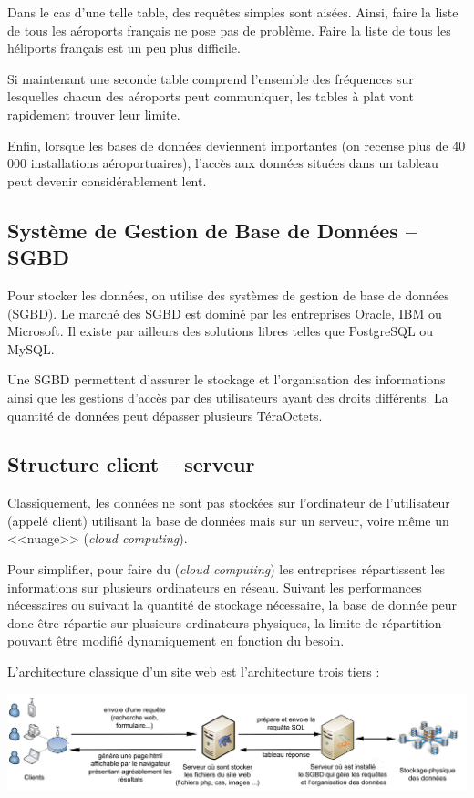 \documentclass[10pt,fleqn]{article} %
\begin{document}
Dans le cas d'une telle table, des requêtes simples sont aisées. Ainsi, faire la liste de tous les aéroports français ne pose pas de problème. Faire la liste de tous les héliports français est un peu plus difficile. 

Si maintenant une seconde table comprend l'ensemble des fréquences sur lesquelles chacun des aéroports peut communiquer, les tables à plat vont rapidement trouver leur limite. 

Enfin, lorsque les bases de données deviennent importantes (on recense plus de 40 000 installations aéroportuaires), l'accès aux données situées dans un tableau peut devenir considérablement lent. 

\subsection{Système de Gestion de Base de Données -- SGBD}
Pour stocker les données, on utilise des systèmes de gestion de base de données (SGBD). Le marché des SGBD est dominé par les entreprises Oracle, IBM ou Microsoft. Il existe par ailleurs des solutions libres telles que PostgreSQL ou MySQL. 

Une SGBD permettent d'assurer le stockage et l'organisation des informations ainsi que les gestions d'accès par des utilisateurs ayant des droits différents. La quantité de données peut dépasser plusieurs TéraOctets.


\subsection{Structure client -- serveur}


Classiquement, les données ne sont pas stockées sur l'ordinateur de l'utilisateur (appelé client) utilisant la base de données mais sur un serveur, voire même un <<nuage>> (\textit{cloud computing}). 

Pour simplifier, pour faire du (\textit{cloud computing}) les entreprises répartissent les informations sur plusieurs ordinateurs en réseau. Suivant les performances nécessaires ou suivant la quantité de stockage nécessaire, la base de donnée peur donc être répartie sur plusieurs ordinateurs physiques, la limite de répartition pouvant être modifié dynamiquement en fonction du besoin. 

L'architecture classique d'un site web est l'architecture trois tiers : 
\begin{center}
\includegraphics[width=.9\textwidth]{images/bdd}
\end{center}
\end{document}
